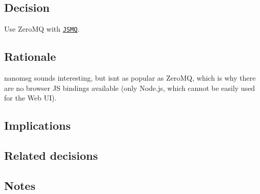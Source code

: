 \subsection*{Decision}

Use Zero\+MQ with \href{https://github.com/zeromq/JSMQ}{\tt J\+S\+MQ}.

\subsection*{Rationale}

nanomsg sounds interesting, but isn\textquotesingle{}t as popular as Zero\+MQ, which is why there are no browser JS bindings available (only Node.\+js, which cannot be easily used for the Web UI).

\subsection*{Implications}

\subsection*{Related decisions}

\subsection*{Notes}